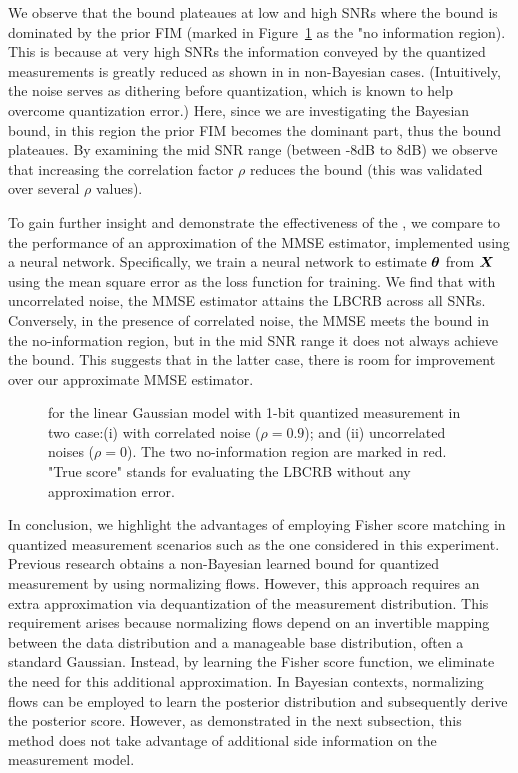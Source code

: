{%
We observe that the bound plateaues at low and high SNRs where the bound is dominated by the prior FIM (marked in Figure~\ref{fig:q_res} as the "no information region}). This is because at very high SNRs {the information conveyed by the quantized measurements is greatly reduced} as shown in \cite{9664619} in non-Bayesian cases. {(Intuitively, the noise serves as dithering before quantization, which is known to help overcome quantization error.)} Here, since we are investigating the Bayesian bound, in this region the prior FIM becomes the dominant part, thus the bound plateaues. By examining the mid SNR range (between -8dB to 8dB) we observe that increasing the correlation factor $\rho$ reduces the bound (this was validated over several $\rho$ values). 

{To gain further insight and demonstrate the effectiveness of the \name{}}, we compare to the performance of an approximation of the MMSE estimator, implemented using a neural network.
Specifically, we train a neural network to estimate $\bm{\theta}$ from $\X$ 
{%
using the mean square error as the loss function for training}. We find that {with uncorrelated noise}, the MMSE estimator attains the LBCRB across all SNRs. Conversely, in the presence of correlated noise, the MMSE meets the bound in the no-information region, but in the mid SNR range it does not always achieve the bound.
{This suggests that in the latter case, there is room for improvement over our approximate MMSE estimator.}



\begin{figure}
    \centering
    
    \caption{\name{} for the linear Gaussian model with 1-bit quantized measurement in %
    two case:(i) with correlated noise ($\rho=0.9$); and (ii) uncorrelated noises ($\rho=0$). 
    The two no-information region are marked in red. "True score" stands for evaluating the LBCRB without any {approximation error}.  %
    }
    \label{fig:q_res}
\end{figure}
In conclusion, we  highlight the advantages of employing Fisher score matching {in quantized measurement scenarios such as the one considered in this experiment.} Previous research \cite{habi2022generative} %
obtains a non-Bayesian learned bound for quantized measurement by using normalizing flows. However, this approach requires an extra approximation via dequantization of the measurement distribution. This requirement arises because normalizing flows depend on an invertible mapping between the data distribution and a manageable base distribution, often a standard Gaussian. Instead, by learning the Fisher score function, we eliminate the need for this additional approximation.
In Bayesian contexts, normalizing flows can be employed to learn the posterior distribution and subsequently derive the posterior score. However, as demonstrated  in {the next subsection,} this method does not take advantage of  additional side information on the measurement model.
